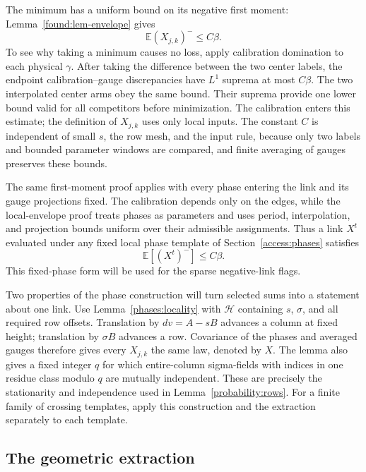 The minimum has a uniform bound on its negative first moment:
Lemma~\ref{found:lem-envelope} gives
\begin{equation}
 \mathbb E(X_{j,k})^-\le C\beta.
 \label{links:negative-moment}
\end{equation}
To see why taking a minimum causes no loss, apply calibration
domination to each physical $\gamma$.  After taking the difference
between the two center labels, the endpoint calibration--gauge
discrepancies have $L^1$ suprema at most $C\beta$.  The two
interpolated center arms obey the same bound.  Their suprema provide
one lower bound valid for all competitors before minimization.
The calibration enters this estimate; the definition of $X_{j,k}$
uses only local inputs.  The constant $C$ is independent of small
$s$, the row mesh, and the input rule, because only two labels and
bounded parameter windows are compared, and finite averaging of
gauges preserves these bounds.

The same first-moment proof applies with every phase entering the link
and its gauge projections fixed. The calibration depends only on the
edges, while the local-envelope proof treats phases as parameters and
uses period, interpolation, and projection bounds uniform over their
admissible assignments. Thus a link \(X^t\) evaluated under any fixed
local phase template of Section~\ref{access:phases} satisfies
\begin{equation}
 \mathbb E[(X^t)^-]\le C\beta.
 \label{links:fixed-phase-negative-moment}
\end{equation}
This fixed-phase form will be used for the sparse negative-link flags.

Two properties of the phase construction will turn selected sums
into a statement about one link.  Use Lemma~\ref{phases:locality}
with $\mathcal H$ containing $s$, $\sigma$, and all required row
offsets.  Translation by $d v=A-sB$ advances a column at fixed
height; translation by $\sigma B$ advances a row.  Covariance of
the phases and averaged gauges therefore gives every $X_{j,k}$
the same law, denoted by $X$.  The lemma also gives a fixed integer
$q$ for which entire-column sigma-fields with indices in one residue
class modulo $q$ are mutually independent.  These are precisely
the stationarity and independence used in Lemma~\ref{probability:rows}.
For a finite family of crossing templates, apply this construction
and the extraction separately to each template.

\subsection{The geometric extraction}

